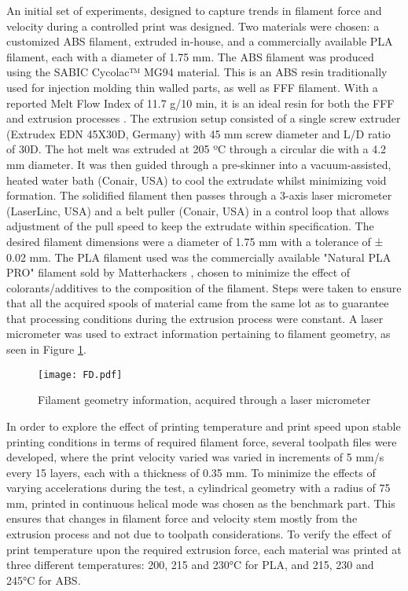 \documentclass[main.tex]{subfiles}
\begin{document}
An initial set of experiments, designed to capture trends in filament force and velocity during a controlled print was designed. Two materials were chosen: a customized ABS filament, extruded in-house, and a commercially available PLA filament, each with a diameter of 1.75 mm. The ABS filament was produced using the SABIC Cycolac™ MG94 material. This is an ABS resin traditionally used for injection molding thin walled parts, as well as FFF filament. With a reported Melt Flow Index of 11.7 g/10 min, it is an ideal resin for both the FFF and extrusion processes \cite{sabic2016}. The extrusion setup consisted of a single screw extruder (Extrudex EDN 45X30D, Germany) with 45 mm screw diameter and L/D ratio of 30D. The hot melt was extruded at 205 ºC through a circular die with a 4.2 mm diameter. It was then guided through a pre-skinner into a vacuum-assisted, heated water bath (Conair, USA) to cool the extrudate whilst minimizing void formation. The solidified filament then passes through a 3-axis laser micrometer (LaserLinc, USA) and a belt puller (Conair, USA) in a control loop that allows adjustment of the pull speed to keep the extrudate within specification. The desired filament dimensions were a diameter of 1.75 mm with a tolerance of ± 0.02 mm. The PLA filament used was the commercially available "Natural PLA PRO" filament sold by Matterhackers \cite{MH2020}, chosen to minimize the effect of colorants/additives to the composition of the filament. Steps were taken to ensure that all the acquired spools of material came from the same lot as to guarantee that processing conditions during the extrusion process were constant. A laser micrometer was used to extract information pertaining to filament geometry, as seen in Figure \ref{fig:FD}.

\begin{figure}[!htbp]
	\center
	\texttt{[image: FD.pdf]}
	\caption{Filament geometry information, acquired through a laser micrometer } \label{fig:FD}
\end{figure}

In order to explore the effect of printing temperature and print speed upon stable printing conditions in terms of required filament force, several toolpath files were developed, where the print velocity varied was varied in increments of 5 mm/s every 15 layers, each with a thickness of 0.35 mm. To minimize the effects of varying accelerations during the test, a cylindrical geometry with a radius of 75 mm, printed in continuous helical mode was chosen as the benchmark part. This ensures that changes in filament force and velocity stem mostly from the extrusion process and not due to toolpath considerations. To verify the effect of print temperature upon the required extrusion force, each material was printed at three different temperatures: 200, 215 and 230°C for PLA, and 215, 230 and 245°C for ABS. 
\end{document}
